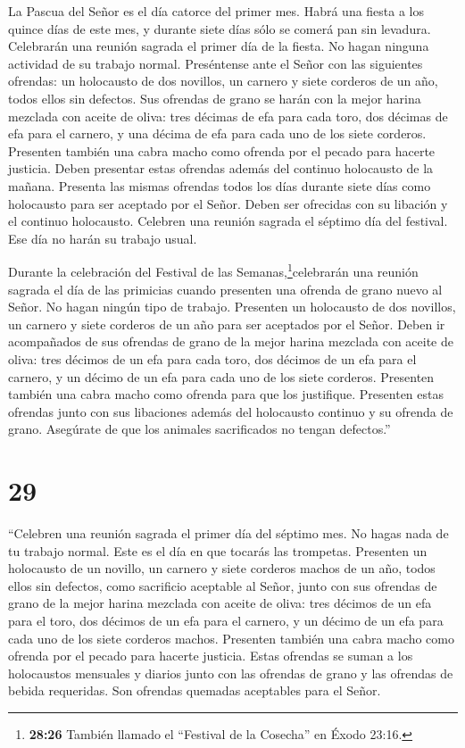  La Pascua del Señor es el día catorce del primer mes.
 Habrá una fiesta a los quince días de este mes, y durante
siete días sólo se comerá pan sin levadura.  Celebrarán una
reunión sagrada el primer día de la fiesta. No hagan ninguna actividad
de su trabajo normal.  Preséntense ante el Señor con las
siguientes ofrendas: un holocausto de dos novillos, un carnero y siete
corderos de un año, todos ellos sin defectos.  Sus ofrendas
de grano se harán con la mejor harina mezclada con aceite de oliva: tres
décimas de efa para cada toro, dos décimas de efa para el carnero,
 y una décima de efa para cada uno de los siete corderos.
 Presenten también una cabra macho como ofrenda por el
pecado para hacerte justicia.  Deben presentar estas
ofrendas además del continuo holocausto de la mañana. 
Presenta las mismas ofrendas todos los días durante siete días como
holocausto para ser aceptado por el Señor. Deben ser ofrecidas con su
libación y el continuo holocausto.  Celebren una reunión
sagrada el séptimo día del festival. Ese día no harán su trabajo usual.

 Durante la celebración del Festival de las
Semanas,\footnote{\textbf{28:26} También llamado el ``Festival de la
  Cosecha'' en Éxodo 23:16.}celebrarán una reunión sagrada el día de las
primicias cuando presenten una ofrenda de grano nuevo al Señor. No hagan
ningún tipo de trabajo.  Presenten un holocausto de dos
novillos, un carnero y siete corderos de un año para ser aceptados por
el Señor.  Deben ir acompañados de sus ofrendas de grano de
la mejor harina mezclada con aceite de oliva: tres décimos de un efa
para cada toro, dos décimos de un efa para el carnero,  y
un décimo de un efa para cada uno de los siete corderos. 
Presenten también una cabra macho como ofrenda para que los justifique.
 Presenten estas ofrendas junto con sus libaciones además
del holocausto continuo y su ofrenda de grano. Asegúrate de que los
animales sacrificados no tengan defectos.''

\hypertarget{section-28}{%
\section{29}\label{section-28}}

 ``Celebren una reunión sagrada el primer día del séptimo
mes. No hagas nada de tu trabajo normal. Este es el día en que tocarás
las trompetas.  Presenten un holocausto de un novillo, un
carnero y siete corderos machos de un año, todos ellos sin defectos,
como sacrificio aceptable al Señor,  junto con sus ofrendas
de grano de la mejor harina mezclada con aceite de oliva: tres décimos
de un efa para el toro, dos décimos de un efa para el carnero,
 y un décimo de un efa para cada uno de los siete corderos
machos.  Presenten también una cabra macho como ofrenda por
el pecado para hacerte justicia.  Estas ofrendas se suman a
los holocaustos mensuales y diarios junto con las ofrendas de grano y
las ofrendas de bebida requeridas. Son ofrendas quemadas aceptables para
el Señor.

